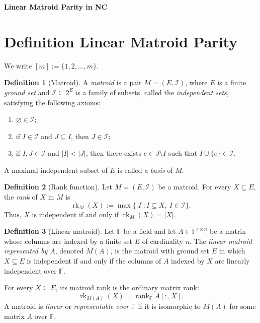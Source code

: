 \documentclass[10pt,a4paper]{article}
\theoremstyle{definition}
\newtheorem{definition}{Definition}
\begin{document}
\begin{center}
  {\Large\bfseries Linear Matroid Parity in NC}
\end{center}
\section{Definition Linear Matroid Parity }
We write $[m]:=\{1,2,\ldots,m\}$.

\begin{definition}[Matroid]
A \emph{matroid} is a pair $M=(E,\mathcal I)$, where $E$ is a finite
\emph{ground set} and $\mathcal I\subseteq 2^E$ is a family of subsets,
called the \emph{independent sets}, satisfying the following axioms:
\begin{enumerate}
  \item $\varnothing\in\mathcal I$;
  \item if $I\in\mathcal I$ and $J\subseteq I$, then $J\in\mathcal I$;
  \item if $I,J\in\mathcal I$ and $|I|<|J|$, then there exists
  $e\in J\setminus I$ such that $I\cup\{e\}\in\mathcal I$.
\end{enumerate}
A maximal independent subset of $E$ is called a \emph{basis} of $M$.
\end{definition}

\begin{definition}[Rank function]
Let $M=(E,\mathcal I)$ be a matroid. For every $X\subseteq E$, the
\emph{rank} of $X$ in $M$ is
\begin{equation}
  \operatorname{rk}_M(X)
  :=\max\bigl\{|I|:I\subseteq X,\ I\in\mathcal I\bigr\}.
\end{equation}
Thus, $X$ is independent if and only if
$\operatorname{rk}_M(X)=|X|$.
\end{definition}

\begin{definition}[Linear matroid]
Let $\mathbb F$ be a field and let
$A\in\mathbb F^{r\times n}$ be a matrix whose columns are indexed by a
finite set $E$ of cardinality $n$. The \emph{linear matroid represented by
$A$}, denoted $M(A)$, is the matroid with ground set $E$ in which
$X\subseteq E$ is independent if and only if the columns of $A$ indexed by
$X$ are linearly independent over $\mathbb F$.

For every $X\subseteq E$, its matroid rank is the ordinary matrix rank:
\begin{equation}
  \operatorname{rk}_{M(A)}(X)=\operatorname{rank}_{\mathbb F} A[:,X].
\end{equation}
A matroid is \emph{linear} or \emph{representable over $\mathbb F$} if it
is isomorphic to $M(A)$ for some matrix $A$ over $\mathbb F$.
\end{definition}
\end{document}
